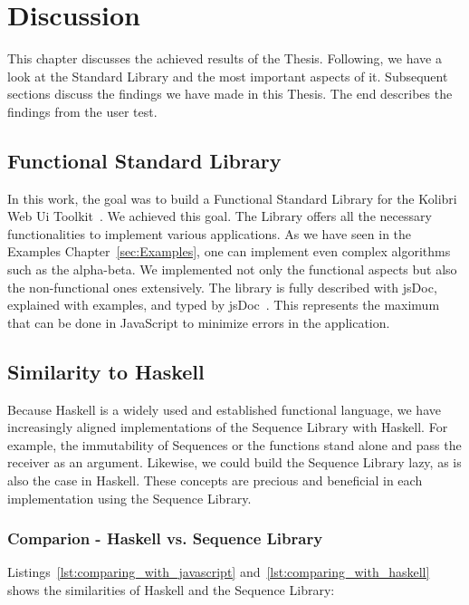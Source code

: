 \section{Discussion}
\label{sec:Discussion}
This chapter discusses the achieved results of the Thesis. Following, we have a look at the
Standard Library and the most important aspects of it. Subsequent sections
discuss the findings we have made in this Thesis. The end describes the
findings from the user test. 

\subsection{Functional Standard Library}
\label{sub:Functional Standard Library}
In this work, the goal was to build a Functional Standard Library for the
Kolibri Web Ui Toolkit~\cite{kolibri}. We achieved
this goal. The Library offers all the necessary functionalities to implement
various applications. As we have seen in the Examples Chapter~\ref{sec:Examples}, one can implement
even complex algorithms such as the alpha-beta. We implemented not only the functional aspects but
also the non-functional ones extensively. The library is fully described with
jsDoc, explained with examples, and typed by jsDoc~\cite{jsdoc_use_2023}. This represents the maximum that can
be done in JavaScript to minimize errors in the application.

\subsection{Similarity to Haskell}
\label{sub:Similarity to Haskell}
Because Haskell is a widely used and established functional language, we have
increasingly aligned implementations of the Sequence Library with Haskell. For
example, the immutability of Sequences or the functions stand alone and pass
the receiver as an argument. Likewise, we could build the Sequence Library
lazy, as is also the case in Haskell. These concepts are precious and
beneficial in each implementation using the Sequence Library.

\subsubsection{Comparion - Haskell vs. Sequence Library}
\label{Comparion - Haskell vs. Sequence Library}
Listings~\ref{lst:comparing_with_javascript} and~\ref{lst:comparing_with_haskell} 
shows the similarities of Haskell and the Sequence Library:

